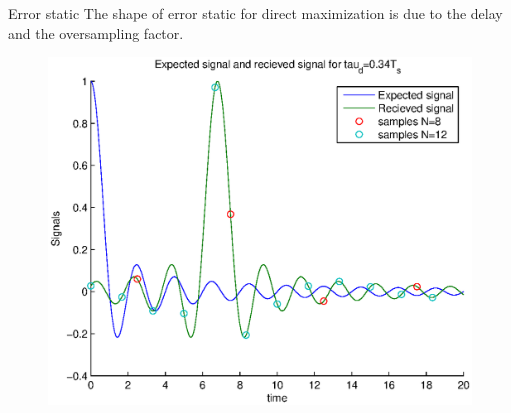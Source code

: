 \documentclass{beamer}
\begin{document}
		\begin{frame}{Error static}
			The shape of error static for direct maximization is due to the delay and the oversampling factor.
			\begin{figure}[h!]
				\center
				\includegraphics[width = \textwidth]{exp.eps}
			\end{figure}
		\end{frame}
\end{document}
